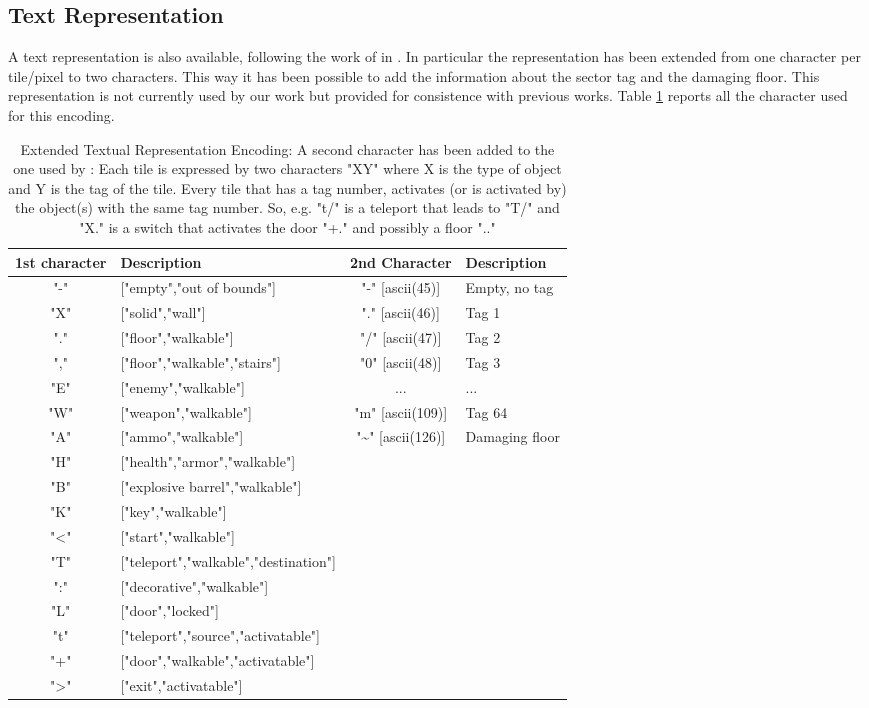 \subsection{Text Representation}
\label{textrep}
A text representation is also available, following the work of \citeauthor{VGLC} in \cite{VGLC}. In particular the representation has been extended from one character per tile/pixel to two characters. This way it has been possible to add the information about the sector tag and the damaging floor. This representation is not currently used by our work but provided for consistence with previous works. Table \ref{tab:textmap} reports all the character used for this encoding.


\begin{table}
	\begin{tabularx}{\textwidth}{| c | l | c | X | }
		\hline
		\textbf{1st character} & \textbf{Description} & \textbf{2nd Character} & \textbf{Description} \\
		\hline
		"-" &	["empty","out of bounds"] &	"-" [ascii(45)] &	Empty, no tag \\
		"X" &	["solid","wall"] &	"." [ascii(46)] &	Tag 1 \\
		"." &	["floor","walkable"] &	"/" [ascii(47)] &	Tag 2 \\
		"," &	["floor","walkable","stairs"] &	"0" [ascii(48)] &	Tag 3 \\
		"E" &	["enemy","walkable"] &	... &	... \\
		"W" &	["weapon","walkable"] &	"m" [ascii(109)] &	Tag 64 \\
		"A" &	["ammo","walkable"] &	"\textasciitilde" [ascii(126)] &	Damaging floor \\
		"H" &	["health","armor","walkable"]	 &	 & \\
		"B" &	["explosive barrel","walkable"]	 &	 & \\
		"K" &	["key","walkable"]		 & & \\
		"\textless" &	["start","walkable"]		 & & \\
		"T" &	["teleport","walkable","destination"]		 & & \\
		":" &	["decorative","walkable"]		 & & \\
		"L" &	["door","locked"]		 & & \\
		"t" &	["teleport","source","activatable"]	 &	 & \\
		"+" &	["door","walkable","activatable"]		 & & \\
		"\textgreater" &	["exit","activatable"]		 & & \\
		\hline
	\end{tabularx}
	\caption[Textual Representation Encoding]{Extended Textual Representation Encoding: A second character has been added to the one used by : Each tile is expressed by two characters "XY" where X is the type of object and Y is the tag of the tile.
		Every tile that has a tag number, activates (or is activated by) the object(s) with the same tag number. 
		So, e.g. "t/" is a teleport that leads to "T/" and "X." is a switch that activates the door "+." and possibly a floor ".."}
	\label{tab:textmap}
\end{table}


